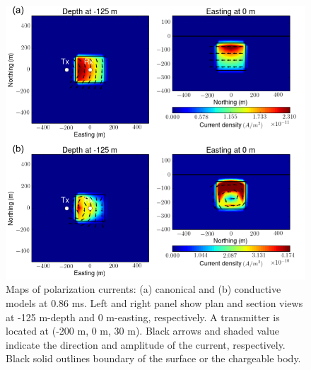 \documentclass[a4paper, 11pt]{article}
\begin{document}
\begin{figure}[htb]
  \centering
  \includegraphics[width=1\textwidth]{figures/Polarizationcurrent_early.png}
  \caption{Maps of polarization currents: (a) canonical and (b) conductive models at 0.86 ms. Left and right panel show plan and section views at -125 m-depth and 0 m-easting, respectively. A transmitter is located at (-200 m, 0 m, 30 m). Black arrows and shaded value indicate the direction and amplitude of the current, respectively. Black solid outlines boundary of the surface or the chargeable body.}
  \label{F:Polarizationcurrent_early}
\end{figure}
\end{document}
